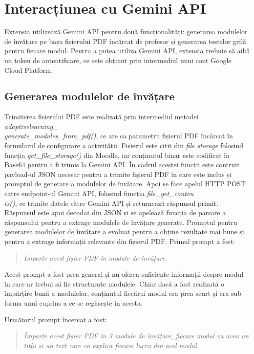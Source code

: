\section{Interacțiunea cu Gemini API}
Extensia utilizează Gemini API pentru două funcționalități: generarea modulelor de învățare pe baza fișierului PDF încărcat de profesor și generarea testelor grilă pentru fiecare modul. 
Pentru a putea utiliza Gemini API, extensia trebuie să aibă un token de autentificare, ce este obținut prin intermediul unui cont Google Cloud Platform.
\subsection{Generarea modulelor de învățare} 
Trimiterea fișierului PDF este realizată prin intermediul metodei \textit{adaptivelearning\_}\\\textit{generate\_modules\_from\_pdf()}, ce are ca parametru fișierul PDF încărcat în formularul de 
configurare a activității. Fișierul este citit din \textit{file storage} folosind funcția \textit{get\_file\_storage()} din Moodle, iar conținutul binar este codificat în Base64 pentru a 
fi trimis la Gemini API. În cadrul acestei funcții este contruit payload-ul JSON necesar pentru a trimite fișierul PDF în care este inclus și promptul de generare a modulelor de învățare.
Apoi se face apelul HTTP POST catre endpoint-ul Gemini API, folosind funcția \textit{file\_get\_conten}\\\textit{ts()}, ce trimite datele către Gemini API și returnează răspunsul primit. 
Răspunsul este apoi decodat din JSON și se apelează funcția de parsare a răspunsului pentru a extrage modulele de învățare generate. Promptul pentru generarea modulelor de învățare 
a evoluat pentru a obține rezultate mai bune și pentru a extrage informații relevante din fișierul PDF. Primul prompt a fost:
\begin{quote}
    \textit{Împarte acest fișier PDF în module de învățare.}
\end{quote}

Acest prompt a fost prea general și nu oferea suficiente informații despre modul în care ar trebui să fie structurate modulele. Chiar dacă a fost realizată o împărțire bună a modulelor, 
conținutul fiecărui modul era prea scurt și era sub forma unui cuprins a ce se regăsește în acesta.

Următorul prompt încercat a fost:
\begin{quote}
    \textit{Împarte acest fișier PDF în 3 module de învățare, fiecare modul va avea un titlu si un text care va explica fiecare lucru din acel modul.}
\end{quote}

